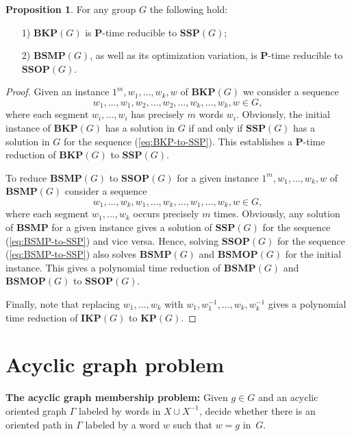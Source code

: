 \documentclass[10pt]{amsart}
\theoremstyle{definition}
\newtheorem{proposition}[theorem]{Proposition}
\def\P{{\mathbf{P}}}
\def\SSP{{\mathbf{SSP}}}
\def\BSMP{{\mathbf{BSMP}}}
\def\BKP{{\mathbf{BKP}}}
\def\KP{{\mathbf{KP}}}
\def\IKP{{\mathbf{IKP}}}
\def\SSOP{{\mathbf{SSOP}}}
\def\BSMOP{{\mathbf{BSMOP}}}
\begin{document}
\begin{proposition}
\label{pr:SSP-BKP}
For any group $G$ the following hold:
\begin{itemize}
\item [1)] $\BKP(G)$ is  $\P$-time reducible to $\SSP(G)$;
\item [2)] $\BSMP(G)$, as well as its optimization variation,  is $\P$-time reducible to $\SSOP(G)$.

\end{itemize}
\end{proposition}
\begin{proof}
Given an instance $1^m,w_1,\ldots,w_k,w$ of $\BKP(G)$ we consider a sequence
   \begin{equation} \label{eq:BKP-to-SSP}
   w_1,  \ldots,w_1, w_2, \ldots, w_2,  \ldots, w_k, \ldots,w_k, w \in G,
   \end{equation}
   where each segment $w_i, \ldots, w_i$ has precisely $m$ words $w_i$.
Obviously, the initial instance of $\BKP(G)$ has a solution in $G$ if and only if  $\SSP(G)$ has a solution in $G$ for the  sequence (\ref{eq:BKP-to-SSP}). This establishes a $\P$-time reduction of $\BKP(G)$ to $\SSP(G)$.

To reduce $\BSMP(G)$ to $\SSOP(G)$ for a given instance  $1^m,w_1,\ldots,w_k,w$ of $\BSMP(G)$ consider a sequence
\begin{equation} \label{eq:BSMP-to-SSP}
   w_1,  \ldots, w_k, w_1, \ldots, w_k,  \ldots, w_1, \ldots, w_k, w \in G,
   \end{equation}
where each segment $w_1,  \ldots, w_k$ occurs precisely $m$ times. Obviously, any solution of $\BSMP$ for a given instance gives a solution of $\SSP(G)$ for the sequence (\ref{eq:BSMP-to-SSP}) and vice versa. Hence, solving $\SSOP(G)$ for the sequence (\ref{eq:BSMP-to-SSP}) also solves $\BSMP(G)$  and  $\BSMOP(G)$ for the initial instance. This gives a  polynomial time reduction of $\BSMP(G)$ and $\BSMOP(G)$  to $\SSOP(G)$.

Finally, note that replacing $w_1,\ldots, w_k$ with
$w_1,w_1^{-1},\ldots, w_k,w_k^{-1}$ gives a polynomial time reduction of $\IKP(G)$ to $\KP(G)$.

\end{proof}

\section{Acyclic graph problem}\label{sec:agp}
\medskip
\noindent
{\bf The acyclic graph membership problem:} Given $g\in G$ and an acyclic oriented graph $\Gamma$ labeled by words in $X\cup X^{-1}$, decide whether there is an oriented path in $\Gamma$ labeled by a word $w$ such that $w=g$ in~$G$.
\end{document}
